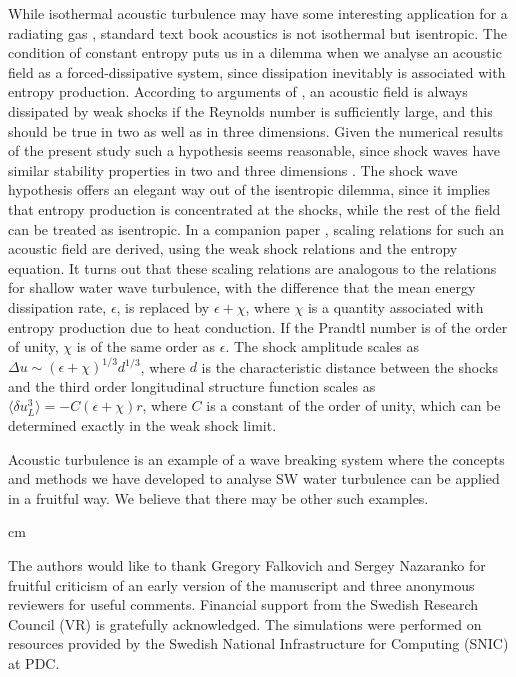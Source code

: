 \documentclass{jfm}
\begin{document}
While isothermal acoustic turbulence may have some interesting application for a radiating gas \cite[]{Stein1967}, standard text book acoustics is not isothermal but isentropic. The  condition of constant entropy puts us in a dilemma when we analyse an acoustic field as a forced-dissipative system, since dissipation inevitably is associated with entropy production.  According to arguments of \cite{KadomtsevPet1973}, an acoustic field is always dissipated by weak shocks if the Reynolds number is sufficiently large,  and this should be true in two as well as in three dimensions.  Given the numerical results of the present study such a hypothesis seems reasonable, since shock waves have similar stability properties 
in two and three dimensions \cite[]{ApazidisEliasson2018, LivertsApazidis2016}.  The shock wave hypothesis offers an elegant way out of the isentropic dilemma, since it implies that entropy production is concentrated at the shocks, while the rest of the field can be treated as isentropic. In a companion paper \cite[]{Lindborg2019}, scaling relations for such an acoustic field are derived, using the weak shock relations and the entropy equation. It turns out that these scaling relations are analogous to the relations for shallow water wave turbulence, with the  difference 
that the mean energy dissipation rate, $ \epsilon $, is replaced by $ \epsilon + \chi $, where $ \chi $ is a quantity associated with entropy production due to heat conduction. If  the Prandtl number is of the order of unity, $ \chi $ is of the same order as $ \epsilon $.  The shock amplitude scales as $ \Delta u \sim (\epsilon + \chi)^{1/3} d^{1/3} $, where $ d $ is the characteristic distance between the shocks and the third order longitudinal structure function scales as $ \langle \delta u_L^{3} \rangle = -C (\epsilon + \chi)r $, where $ C $ is a constant of the order of unity, which can be determined exactly in the weak shock limit. 

Acoustic turbulence is an example of a wave breaking system where the concepts and methods we have developed to analyse SW water turbulence can be applied in a fruitful way.  We believe that there may be other such examples.


 cm

\noindent The authors would like to thank Gregory Falkovich and Sergey Nazaranko for  fruitful criticism of an early version of the manuscript and three anonymous reviewers for useful comments. Financial
support from the Swedish Research Council (VR) is gratefully
acknowledged. The simulations were performed
on resources provided by the Swedish National Infrastructure
for Computing (SNIC) at PDC.
\end{document}

